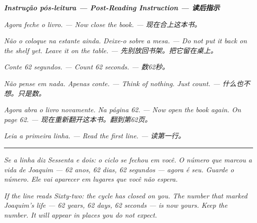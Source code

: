 \documentclass[14pt,openany]{extbook}
\begin{document}
\thispagestyle{empty}
\null
\vfill
\begin{center}

\vspace*{\fill}

\noindent\textit{\textcolor{sangue}{\textbf{Instrução pós-leitura --- Post-Reading Instruction --- 读后指示}}}

\vspace{1.5em}

\noindent\textit{Agora feche o livro. --- Now close the book. --- 现在合上这本书。}

\noindent\textit{Não o coloque na estante ainda. Deixe-o sobre a mesa. --- Do not put it back on the shelf yet. Leave it on the table. --- 先别放回书架。把它留在桌上。}

\vspace{0.8em}

\noindent\textit{Conte 62 segundos. --- Count 62 seconds. --- 数62秒。}

\noindent\textit{Não pense em nada. Apenas conte. --- Think of nothing. Just count. --- 什么也不想。只是数。}

\vspace{0.8em}

\noindent\textit{Agora abra o livro novamente. Na página 62. --- Now open the book again. On page 62. --- 现在重新翻开这本书。翻到第62页。}

\noindent\textit{Leia a primeira linha. --- Read the first line. --- 读第一行。}

\vspace{1em}

\noindent\textcolor{sangue}{\rule{0.15\textwidth}{0.5pt}}

\vspace{1em}

\noindent\textit{Se a linha diz \textquotedbl{}Sessenta e dois\textquotedbl{}: o ciclo se fechou em você. O número que marcou a vida de Joaquim --- 62 anos, 62 dias, 62 segundos --- agora é seu. Guarde o número. Ele vai aparecer em lugares que você não espera.}

\noindent\textit{If the line reads \textquotedbl{}Sixty-two\textquotedbl{}: the cycle has closed on you. The number that marked Joaquim's life --- 62 years, 62 days, 62 seconds --- is now yours. Keep the number. It will appear in places you do not expect.}


\end{center}
\end{document}
